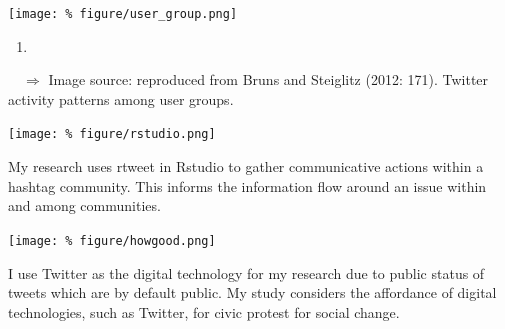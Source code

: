\documentclass[unknownkeysallowed,usepdftitle=false, parskip=full]{beamer}
\newcommand{\secvariable}{nothing}
\newcommand{\mysection}[1]{\renewcommand{\secvariable}{#1}
}
\begin{document}
\mysection{line}
\begin{frame}\label{\secvariable}
\begin{center}
  \vspace{-0.5cm}
 \texttt{[image: \%
  figure/user\_group.png]}
\end{center}
  \vspace{-0.5cm}
  \begin{enumerate}[]
  
  
\item
  \end{enumerate}
  $\quad \Rightarrow$  Image source: reproduced from Bruns and Steiglitz (2012: 171). Twitter activity patterns among user groups.
  
\end{frame}

\mysection{major}
\begin{frame}\label{\secvariable} %
\begin{center}
 \texttt{[image: \%
  figure/rstudio.png]}
\end{center}

    \parbox{\linewidth}{

My research uses rtweet in Rstudio to gather communicative actions within a hashtag community. This informs the information flow around an issue within and among communities.
}
\end{frame}

\mysection{slab}
\begin{frame}\label{\secvariable}
\begin{center}
\texttt{[image: \%
figure/howgood.png]}
\end{center}
    \parbox{\linewidth}
    {

I use Twitter as the digital technology for my research due to public status of tweets which are by default public.
My study considers the affordance of digital technologies, such as Twitter, for civic protest for social change.
}

\hyperlink{slabtable}{}


\end{frame}
\end{document}
